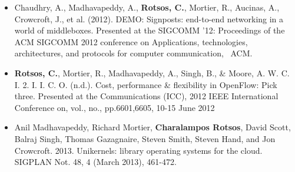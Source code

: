 \begin{itemize}
  \item Chaudhry, A., Madhavapeddy, A., \textbf{Rotsos, C.}, Mortier,
        R., Aucinas, A., Crowcroft, J., et al. (2012). DEMO: Signposts:
        end-to-end networking in a world of middleboxes. Presented at
        the SIGCOMM '12: Proceedings of the ACM SIGCOMM 2012 conference
        on Applications, technologies, architectures, and protocols for
        computer communication,  ACM.

  \item \textbf{Rotsos, C.}, Mortier, R., Madhavapeddy, A., Singh, B., \& Moore,
        A. W. C.  I. 2. I. I. C. O. (n.d.). Cost, performance \& flexibility in
        OpenFlow: Pick three. Presented at the Communications (ICC), 2012 IEEE
        International Conference on, vol., no., pp.6601,6605, 10-15 June 2012

  \item Anil Madhavapeddy, Richard Mortier, \textbf{Charalampos Rotsos}, David Scott,
        Balraj Singh, Thomas Gazagnaire, Steven Smith, Steven Hand, and Jon
        Crowcroft. 2013. Unikernels: library operating systems for the cloud.
        SIGPLAN Not. 48, 4 (March 2013), 461-472. 
\end{itemize}


